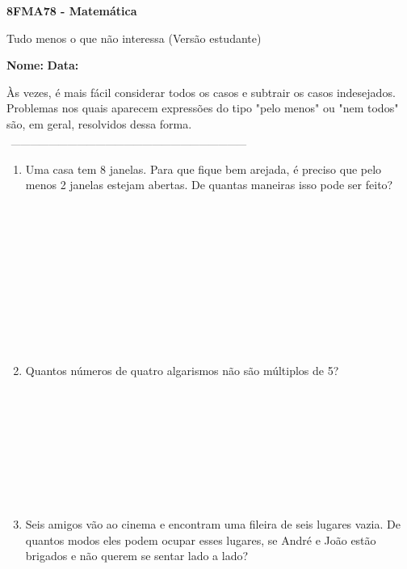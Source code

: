 \documentclass[a4paper,14pt]{article}
\begin{document}
	
	\noindent\textbf{8FMA78 - Matemática} 
	
	\begin{center}Tudo menos o que não interessa (Versão estudante)
	\end{center}
	
	\noindent\textbf{Nome:} \underline{\hspace{10cm}}
	\noindent\textbf{Data:} \underline{\hspace{4cm}}
	
	
	
    \begin{multicols}{2}
    	\noindent Às vezes, é mais fácil considerar todos os casos e subtrair os casos indesejados. Problemas nos quais aparecem expressões do tipo "pelo menos" ou "nem todos" são, em geral, resolvidos dessa forma.
    	\noindent\textsubscript{~---------------------------------------------------------------------------}
		\begin{enumerate}
			\item Uma casa tem 8 janelas. Para que fique bem arejada, é preciso que pelo menos 2 janelas estejam abertas. De quantas maneiras isso pode ser feito? \\\\\\\\\\\\\\\\\\\\\\
			\item Quantos números de quatro algarismos não são múltiplos de 5? \\\\\\\\\\\\\\\\\\
			\item Seis amigos vão ao cinema e encontram uma fileira de seis lugares vazia. De quantos modos eles podem ocupar esses lugares, se André e João estão brigados e não querem se sentar lado a lado? \\\\\\\\\\\\\\\\\\

\end{enumerate}
\end{multicols}
\end{document}
